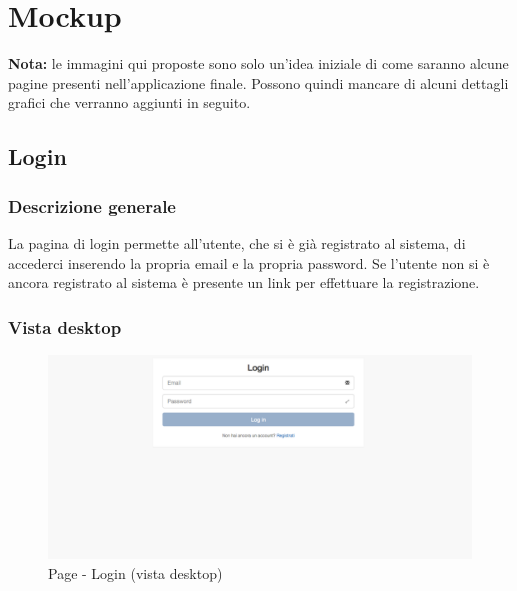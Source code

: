 %

\appendix


\section{Mockup} %
\label{sec:mockup}
\textbf{Nota:} le immagini qui proposte sono solo un'idea iniziale di come saranno alcune pagine presenti nell'applicazione finale. Possono quindi mancare di alcuni dettagli grafici che verranno aggiunti in seguito.

	\subsection{Login} %
	\label{sub:login}
		\subsubsection{Descrizione generale} %
		La pagina di login permette all'utente, che si è già registrato al sistema, di accederci inserendo la propria email e la propria password. Se l'utente non si è ancora registrato al sistema è presente un link per effettuare la registrazione.

		\subsubsection{Vista desktop} %
		\begin{figure}[!h]
			\centering
			\centerline{\includegraphics[scale=0.4]{./images/mockup/login_vd.pdf}}
			\caption{Page - Login (vista desktop)}
		\end{figure}
\clearpage

